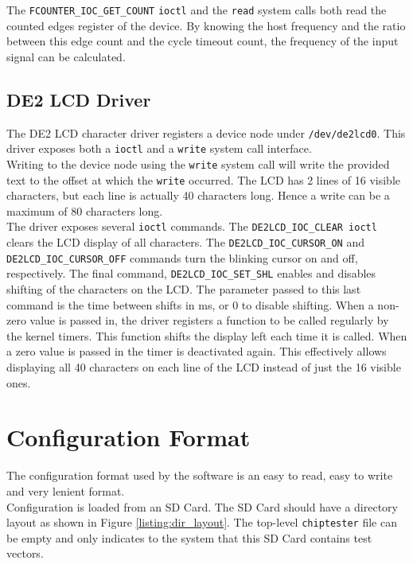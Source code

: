 The \texttt{FCOUNTER\_IOC\_GET\_COUNT} \texttt{ioctl} and the \texttt{read} system calls both
read the counted edges register of the device. By knowing the host frequency and the ratio
between this edge count and the cycle timeout count, the frequency of the input signal
can be calculated.


\subsection{DE2 LCD Driver}
The DE2 LCD character driver registers a device node under \texttt{/dev/de2lcd0}.
This driver exposes both a \texttt{ioctl} and a \texttt{write} system call interface.
\\

Writing to the device node using the \texttt{write} system call will write the provided
text to the offset at which the \texttt{write} occurred. The LCD has 2 lines of 16 visible characters,
but each line is actually 40 characters long. Hence a write can be a maximum of 80 characters long.
\\

The driver exposes several \texttt{ioctl} commands. The \texttt{DE2LCD\_IOC\_CLEAR ioctl}
clears the LCD display of all characters. The \texttt{DE2LCD\_IOC\_CURSOR\_ON} and
\\
\texttt{DE2LCD\_IOC\_CURSOR\_OFF} commands turn the blinking cursor on and off, respectively.
The final command, \texttt{DE2LCD\_IOC\_SET\_SHL} enables and disables shifting of the
characters on the LCD. The parameter passed to this last command is the time between shifts
in ms, or 0 to disable shifting. When a non-zero value is passed in, the driver registers
a function to be called regularly by the kernel timers. This function shifts the display
left each time it is called. When a zero value is passed in the timer is deactivated again.
This effectively allows displaying all 40 characters on each line of the LCD instead of just
the 16 visible ones.




\newpage
\section{Configuration Format}
The configuration format used by the software is an easy to read, easy to write and very
lenient format.
\\

Configuration is loaded from an SD Card. The SD Card should have a directory layout
as shown in Figure \ref{listing:dir_layout}.
The top-level \texttt{chiptester} file can be empty and only
indicates to the system that this SD Card contains test vectors.
\\

